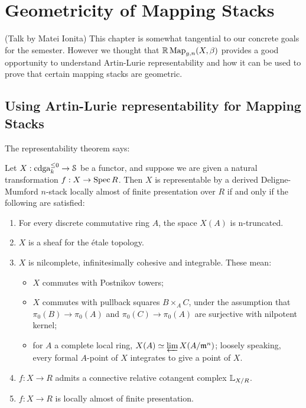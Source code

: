 \chapter{Geometricity of Mapping Stacks}
\label{ch3:geom}

(Talk by Matei Ionita)  This chapter is somewhat tangential to our concrete goals for the semester. However we thought that $\mathbb R\operatorname{Map}_{g,n}(X,\beta)$
provides a good opportunity to understand Artin-Lurie representability and how it can be used to prove that certain
mapping stacks are geometric.


\section{Using Artin-Lurie representability for Mapping Stacks}
The representability theorem says:

\begin{thm}
\cite{thm:lurie_representability}
Let $X: \operatorname{cdga}_k^{\leq 0}\to \mathcal S$ be a functor, and suppose we are given a natural transformation $f:X \to \operatorname{Spec} R$.
 Then $X$ is representable by a derived Deligne-Mumford $n$-stack locally almost of finite
presentation over $R$ if and only if the following are satisfied:
\begin{enumerate}
\item For every discrete commutative ring $A$, the space $X(A)$ is n-truncated.
\item $X$ is a sheaf for the \'etale topology.
\item $X$ is nilcomplete, infinitesimally cohesive and integrable. These mean:
\begin{itemize}
\item $X$ commutes with Postnikov towers;
\item $X$ commutes with pullback squares $B \times_A C$, under the assumption that $\pi_0(B) \to \pi_0(A)$ and $\pi_0(C) \to \pi_0(A)$
are surjective with nilpotent kernel;
\item for $A$ a complete local ring, $X(A) \simeq \varprojlim X(A/\mathfrak m^n)$; loosely speaking, every formal $A$-point of $X$
integrates to give a point of $X$.
\end{itemize}
\item $f:X \to R$ admits a connective relative cotangent complex $\mathbb L_{X/R}$.
\item $f:X \to R$ is locally almost of finite presentation.
\end{enumerate}
\end{thm}

